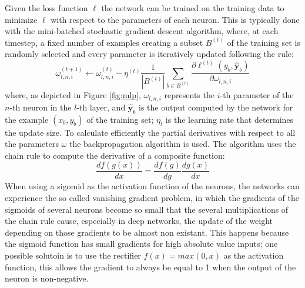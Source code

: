 \documentclass[12pt]{article}
\newcommand{\vect}[1]{\boldsymbol{#1}}
\begin{document}
Given the loss function $\ell$ the network can be trained on the training data to minimize $\ell$ with respect to the parameters of each neuron. This is typically done with the mini-batched stochastic gradient descent algorithm, where, at each timestep, a fixed number of examples creating a subset $B^{(t)}$ of the training set is randomly selected and every parameter is iteratively updated following the rule:
\begin{equation}
\label{eq:sgd}
\omega_{l,n,i}^{(t+1)} \leftarrow \omega_{l,n,i}^{(t)} - \eta^{(t)}\frac{1}{|B^{(t)}|}\sum_{b \in B^{(t)}}{\frac{\partial \ell^{(t)}(y_b,\vect{\hat{y}}_b)}{\partial \omega_{l,n,i}}}
\end{equation}
where, as depicted in Figure \ref{fig:mlp}, $\omega_{l,n,i}$ represents the $i$-th parameter of the $n$-th neuron in the $l$-th layer, and $\vect{\hat{y}}_b$ is the output computed by the network for the example $(x_b, y_b)$ of the training set; $\eta_t$ is the learning rate that determines the update size. To calculate efficiently the partial derivatives with respect to all the parameters $\omega$ the backpropagation algorithm is used. The algorithm uses the chain rule to compute the derivative of a composite function:
$$
\frac{df(g(x))}{dx} = \frac{df(g)}{dg} \frac{dg(x)}{dx}
$$
When using a sigomid as the activation function of the neurons, the networks can experience the so called vanishing gradient problem, in which the gradients of the sigmoids of several neurons become so small that the several multiplications of the chain rule cause, especially in deep networks, the update of the weight depending on those gradients to be almost non existant. This happens because the sigmoid function has small gradients for high absolute value inputs; one possible solutoin is to use the rectifier $f(x) = max(0,x)$ as the activation function, this allows the gradient to always be equal to 1 when the output of the neuron is non-negative.
\end{document}
